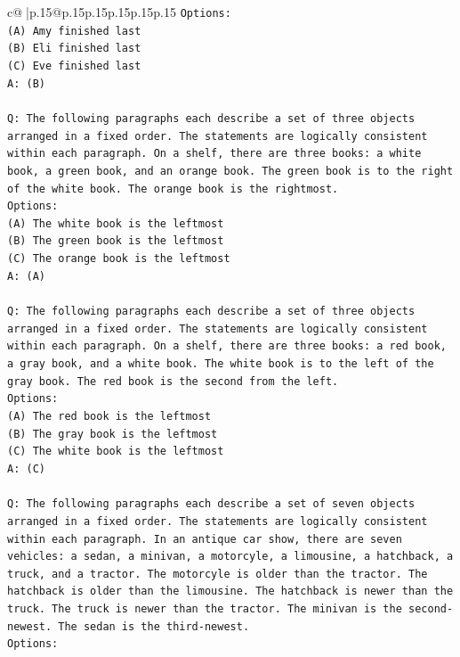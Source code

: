 \documentclass{article}
\begin{document}
{\begin{supertabular}{c@{$\;$}|p{.15\linewidth}@{}p{.15\linewidth}p{.15\linewidth}p{.15\linewidth}p{.15\linewidth}p{.15\linewidth}}
{{{\texttt{Options:} \\
\texttt{(A) Amy finished last} \\
\texttt{(B) Eli finished last} \\
\texttt{(C) Eve finished last} \\
\texttt{A: (B)} \\
\\ 
\texttt{Q: The following paragraphs each describe a set of three objects arranged in a fixed order. The statements are logically consistent within each paragraph. On a shelf, there are three books: a white book, a green book, and an orange book. The green book is to the right of the white book. The orange book is the rightmost.} \\
\texttt{Options:} \\
\texttt{(A) The white book is the leftmost} \\
\texttt{(B) The green book is the leftmost} \\
\texttt{(C) The orange book is the leftmost} \\
\texttt{A: (A)} \\
\\ 
\texttt{Q: The following paragraphs each describe a set of three objects arranged in a fixed order. The statements are logically consistent within each paragraph. On a shelf, there are three books: a red book, a gray book, and a white book. The white book is to the left of the gray book. The red book is the second from the left.} \\
\texttt{Options:} \\
\texttt{(A) The red book is the leftmost} \\
\texttt{(B) The gray book is the leftmost} \\
\texttt{(C) The white book is the leftmost} \\
\texttt{A: (C)} \\
\\ 
\texttt{Q: The following paragraphs each describe a set of seven objects arranged in a fixed order. The statements are logically consistent within each paragraph. In an antique car show, there are seven vehicles: a sedan, a minivan, a motorcyle, a limousine, a hatchback, a truck, and a tractor. The motorcyle is older than the tractor. The hatchback is older than the limousine. The hatchback is newer than the truck. The truck is newer than the tractor. The minivan is the second{-}newest. The sedan is the third{-}newest.} \\
\texttt{Options:} \\
}}}
\end{supertabular}}
\end{document}
